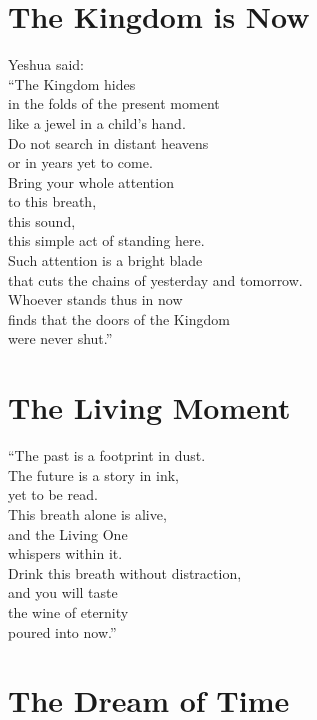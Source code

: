 \documentclass[10pt, openright]{book}
\newcommand{\sectionbreak}{\filbreak}
\begin{document}
\sectionbreak

\section{The Kingdom is Now}\label{the-kingdom-is-now}

Yeshua said:\\
``The Kingdom hides\\
in the folds of the present moment\\
like a jewel in a child's hand.\\
Do not search in distant heavens\\
or in years yet to come.\\
Bring your whole attention\\
to this breath,\\
this sound,\\
this simple act of standing here.\\
Such attention is a bright blade\\
that cuts the chains of yesterday and tomorrow.\\
Whoever stands thus in now\\
finds that the doors of the Kingdom\\
were never shut.''

\sectionbreak

\section{The Living Moment}\label{the-living-moment}

``The past is a footprint in dust.\\
The future is a story in ink,\\
yet to be read.\\
This breath alone is alive,\\
and the Living One\\
whispers within it.\\
Drink this breath without distraction,\\
and you will taste\\
the wine of eternity\\
poured into now.''

\sectionbreak

\section{The Dream of Time}\label{the-dream-of-time}
\end{document}
